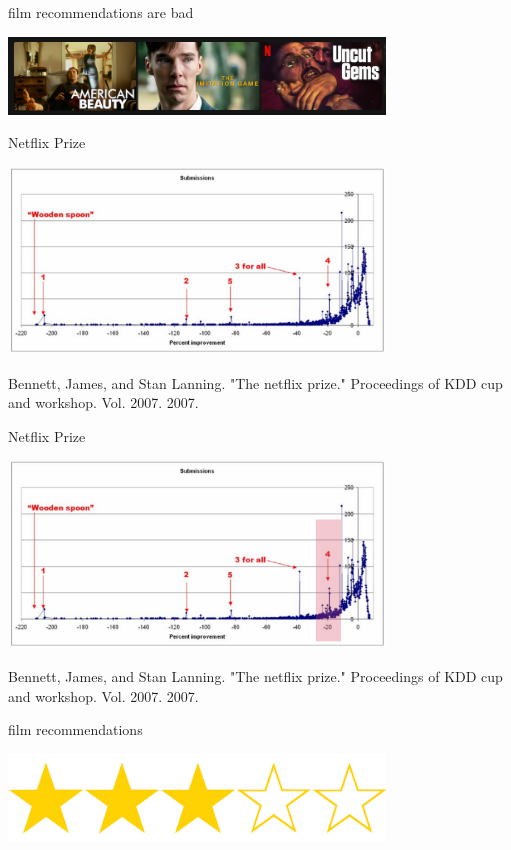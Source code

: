 \documentclass{beamer}
\begin{document}
\begin{frame}{film  recommendations are bad}
 \begin{center}
    \includegraphics[width=10cm]{netflix_recommends.png}
 \end{center}
 \end{frame}

\begin{frame}{Netflix Prize}
  \begin{center}
    \includegraphics[width=10cm]{netflix_prize.png}
  \end{center}
  \vfill
\tiny{Bennett, James, and Stan Lanning. "The netflix prize." Proceedings of KDD cup and workshop. Vol. 2007. 2007.}
\end{frame}


\begin{frame}{Netflix Prize}
  \begin{center}
    \includegraphics[width=10cm]{netflix_prize_1.png}
  \end{center}
  \vfill
\tiny{Bennett, James, and Stan Lanning. "The netflix prize." Proceedings of KDD cup and workshop. Vol. 2007. 2007.}
\end{frame}

\begin{frame}{film  recommendations}
  \begin{center}
    \includegraphics[width=10cm]{stars.png}
  \end{center}
\end{frame}
\end{document}
